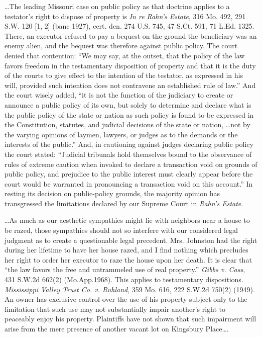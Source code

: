 \ldots The leading Missouri case on public policy as that doctrine applies to a
testator's right to dispose of property is \textit{In re Rahn's Estate}, 316
Mo. 492, 291 S.W. 120 [1, 2] (banc 1927), cert. den. 274 U.S. 745, 47 S.Ct.
591, 71 L.Ed. 1325. There, an executor refused to pay a bequest on the ground
the beneficiary was an enemy alien, and the bequest was therefore against
public policy. The court denied that contention: ``We may say, at the outset,
that the policy of the law favors freedom in the testamentary disposition of
property and that it is the duty of the courts to give effect to the intention
of the testator, as expressed in his will, provided such intention does not
contravene an established rule of law.'' And the court wisely added, ``it is
not the function of the judiciary to create or announce a public policy of its
own, but solely to determine and declare what is the public policy of the state
or nation as such policy is found to be expressed in the Constitution,
statutes, and judicial decisions of the state or nation, \ldots not by the
varying opinions of laymen, lawyers, or judges as to the demands or the
interests of the public.'' And, in cautioning against judges declaring public
policy the court stated: ``Judicial tribunals hold themselves bound to the
observance of rules of extreme caution when invoked to declare a transaction
void on grounds of public policy, and prejudice to the public interest must
clearly appear before the court would be warranted in pronouncing a transaction
void on this account.'' In resting its decision on public-policy grounds, the
majority opinion has transgressed the limitations declared by our Supreme Court
in \textit{Rahn's Estate}.

\ldots As much as our aesthetic sympathies might lie with neighbors near a house
to be razed, those sympathies should not so interfere with our considered legal
judgment as to create a questionable legal precedent. Mrs. Johnston had the
right during her lifetime to have her house razed, and I find nothing which
precludes her right to order her executor to raze the house upon her death. It
is clear that ``the law favors the free and untrammeled use of real property.''
\textit{Gibbs v. Cass}, 431 S.W.2d 662(2) (Mo.App.1968). This applies to
testamentary dispositions. \textit{Mississippi Valley Trust Co. v. Ruhland},
359 Mo. 616, 222 S.W.2d 750(2) (1949). An owner has exclusive control over the
use of his property subject only to the limitation that such use may not
substantially impair another's right to peaceably enjoy his property.
Plaintiffs have not shown that such impairment will arise from the mere
presence of another vacant lot on Kingsbury Place\ldots.

